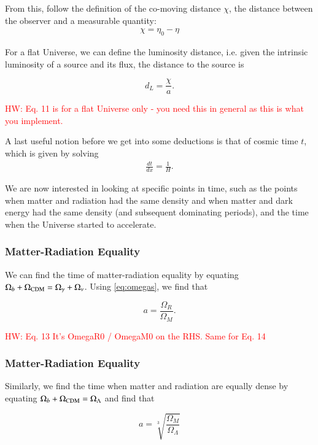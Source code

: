 \documentclass{aa}
\newcommand{\hw}[1]{\textcolor{red}{HW: #1}}
\begin{document}
From this, follow the definition of the co-moving distance $\chi$, the distance between the observer and a measurable quantity:
\begin{align}
\chi = \eta_0 - \eta
\end{align}

For a flat Universe, we can define the luminosity distance, i.e. given the intrinsic luminosity of a source and its flux, the distance to the source is

\begin{equation}
    d_L = \frac{\chi}{a}.
\end{equation}

\hw{Eq. 11 is for a flat Universe only - you need this in general as this is what you implement.}

A last useful notion before we get into some deductions is that of cosmic time $t$, which is given by solving
\begin{align}
\label{eq:t-ode}
\frac{dt}{dx} = \frac{1}{H}.
\end{align}

We are now interested in looking at specific points in time, such as the points when matter and radiation had the same density and when matter and dark energy had the same density (and subsequent dominating periods), and the time when the Universe started to accelerate.

\subsubsection{Matter-Radiation Equality}

We can find the time of matter-radiation equality by equating $
\Omega_b + \Omega_{\rm CDM} = \Omega_\gamma + \Omega_{\nu}$. Using \eqref{eq:omegas}, we find that

\begin{equation}
    a = \frac{\Omega_R}{\Omega_M}.
\end{equation}

\hw{Eq. 13 It's OmegaR0 / OmegaM0 on the RHS. Same for Eq. 14}

\subsubsection{Matter-Radiation Equality}

Similarly, we find the time when matter and radiation are equally dense by equating $\Omega_b + \Omega_{\rm CDM} = \Omega_{\Lambda}$ and find that

\begin{equation}
    a = \sqrt[3]{\frac{\Omega_M}{\Omega_{\Lambda}}}
\end{equation}
\end{document}
